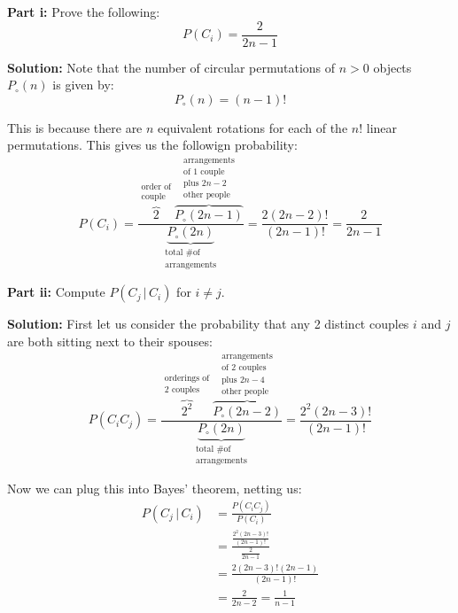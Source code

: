 \documentclass{article}
\newcommand*\pbar[0]{\,|\,}
\begin{document}
\noindent\textbf{Part i:} Prove the following:
\begin{equation*}
    P(C_i)=\frac{2}{2n-1}
\end{equation*}
\bigskip

\noindent\textbf{Solution:} Note that the number of circular permutations of $n>0$ objects $P_\circ(n)$ is given by:
\begin{equation*}
    P_\circ(n)=(n-1)!
\end{equation*}

This is because there are $n$ equivalent rotations for each of the $n!$ linear permutations. This gives us the followign probability:
\begin{equation*}
    P(C_i)=\frac{\overbrace{2}^{\substack{\text{order of}\\\text{couple}}}\overbrace{P_\circ(2n-1)}^{\substack{\text{arrangements}\\\text{of 1 couple}\\\text{plus }2n-2\\\text{other people}}}}{\underbrace{P_\circ(2n)}_{\substack{\text{total \# of}\\\text{arrangements}}}}=\frac{2(2n-2)!}{(2n-1)!}=\frac{2}{2n-1}
\end{equation*}

\bigskip

\noindent\textbf{Part ii:} Compute $P(C_j\pbar C_i)$ for $i\not=j$.
\bigskip

\noindent\textbf{Solution:} First let us consider the probability that any 2 distinct couples $i$ and $j$ are both sitting next to their spouses:
\begin{equation*}
    P(C_iC_j)=\frac{\overbrace{2^2}^{\substack{\text{orderings of}\\\text{2 couples}}}\overbrace{P_\circ(2n-2)}^{\substack{\text{arrangements}\\\text{of 2 couples}\\\text{plus }2n-4\\\text{other people}}}}{\underbrace{P_\circ(2n)}_{\substack{\text{total \# of}\\\text{arrangements}}}}=\frac{2^2(2n-3)!}{(2n-1)!}
\end{equation*}

Now we can plug this into Bayes' theorem, netting us:
\begin{align*}
    P(C_j\pbar C_i)&=\frac{P(C_iC_j)}{P(C_i)}\tag{Bayes' theorem}\\
    &=\frac{\frac{2^2(2n-3)!}{(2n-1)!}}{\frac{2}{2n-1}}\tag{above \& part i}\\
    &=\frac{2(2n-3)!(2n-1)}{(2n-1)!}\\
    &=\frac{2}{2n-2}=\frac{1}{n-1}
\end{align*}
\end{document}
